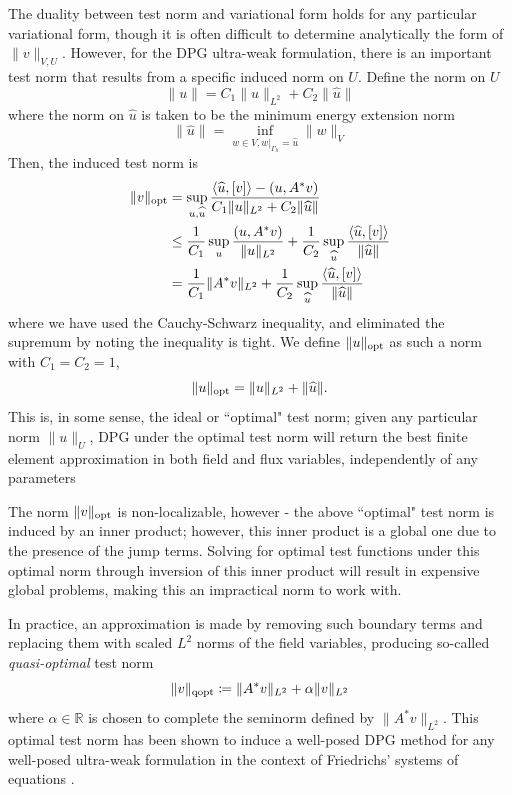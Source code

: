 \documentclass[11pt,onecolumn]{scrartcl}
\begin{document}
The duality between test norm and variational form holds for any particular variational form, though it is often difficult to determine analytically the form of $\|v\|_{V,U}$.  However, for the DPG ultra-weak formulation, there is an important test norm that results from a specific induced norm on $U$.  
Define the norm on $U$
\[
\|u\| = C_1\|u\|_{L^2} + C_2\|\widehat{u}\|
\]
where the norm on $\widehat{u}$ is taken to be the minimum energy extension norm
\[
\|\widehat{u}\| = \inf_{w\in V, \left.w\right|_{\Gamma_h}=\widehat{u}} \|w\|_V
\]
Then, the induced test norm is 
\begin{align*}
\|v\|_{\rm opt} &= \sup_{u,\widehat{u}} \frac{\langle \widehat{u}, [v] \rangle - (u,A^*v)}{C_1\|u\|_{L^2} + C_2\|\widehat{u}\|} \\
&\leq \frac{1}{C_1}\sup_{u} \frac{(u,A^*v)}{\|u\|_{L^2}} + \frac{1}{C_2}\sup_{\widehat{u}} \frac{\langle \widehat{u}, [v] \rangle}{\|\widehat{u}\|}\\
&= \frac{1}{C_1}\|A^*v\|_{L^2} + \frac{1}{C_2}\sup_{\widehat{u}} \frac{\langle \widehat{u}, [v] \rangle}{\|\widehat{u}\|}
\end{align*}
where we have used the Cauchy-Schwarz inequality, and eliminated the supremum by noting the inequality is tight.  We define $\|u\|_{\rm opt}$ as such a norm with $C_1=C_2 = 1$,
\[
\|u\|_{\rm opt} = \|u\|_{L^2} + \|\widehat{u}\|.
\]
This is, in some sense, the ideal or ``optimal" test norm; given any particular norm $\|u\|_U$, DPG under the optimal test norm will return the best finite element approximation in both field and flux variables, independently of any parameters

The norm $\|v\|_{\rm opt}$ is non-localizable, however - the above ``optimal" test norm is induced by an inner product; however, this inner product is a global one due to the presence of the jump terms.  Solving for optimal test functions under this optimal norm through inversion of this inner product  will result in expensive global problems, making this an impractical norm to work with.  

In practice, an approximation is made by removing such boundary terms and replacing them with scaled $L^2$ norms of the field variables, producing so-called \textit{quasi-optimal} test norm
\[
\|v\|_{\rm qopt} \coloneqq \|A^*v\|_{L^2} + \alpha \|v\|_{L^2}
\]
where $\alpha \in \mathbb{R}$ is chosen to complete the seminorm defined by $\|A^*v\|_{L^2}$.  This optimal test norm has been shown to induce a well-posed DPG method for any well-posed ultra-weak formulation in the context of Friedrichs' systems of equations \cite{DPGFriedrichs}.  
\end{document}
